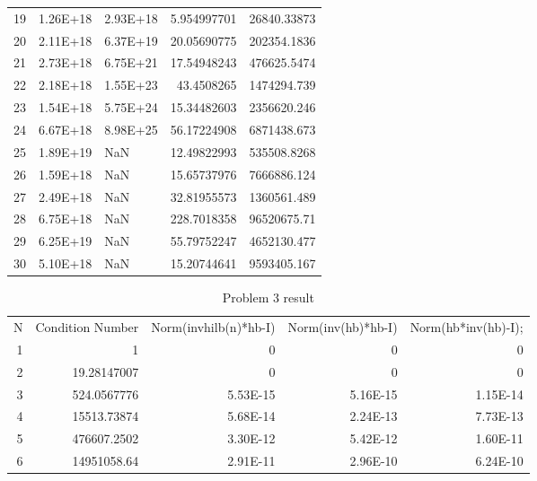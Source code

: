 \documentclass[12pt]{article}
\begin{document}
\begin{enumerate}
\begin{landscape}
\begin{table}[htbp]
\begin{tabular}{rrlrr}
      19    & 1.26E+18 & \multicolumn{1}{r}{2.93E+18} & 5.954997701 & 26840.33873 \\
      20    & 2.11E+18 & \multicolumn{1}{r}{6.37E+19} & 20.05690775 & 202354.1836 \\
      21    & 2.73E+18 & \multicolumn{1}{r}{6.75E+21} & 17.54948243 & 476625.5474 \\
      22    & 2.18E+18 & \multicolumn{1}{r}{1.55E+23} & 43.4508265 & 1474294.739 \\
      23    & 1.54E+18 & \multicolumn{1}{r}{5.75E+24} & 15.34482603 & 2356620.246 \\
      24    & 6.67E+18 & \multicolumn{1}{r}{8.98E+25} & 56.17224908 & 6871438.673 \\
      25    & 1.89E+19 & NaN   & 12.49822993 & 535508.8268 \\
      26    & 1.59E+18 & NaN   & 15.65737976 & 7666886.124 \\
      27    & 2.49E+18 & NaN   & 32.81955573 & 1360561.489 \\
      28    & 6.75E+18 & NaN   & 228.7018358 & 96520675.71 \\
      29    & 6.25E+19 & NaN   & 55.79752247 & 4652130.477 \\
      30    & 5.10E+18 & NaN   & 15.20744641 & 9593405.167 \\
      \end{tabular}%
    \label{tab:addlabel}%
  \end{table}%
    \end{landscape}
  \begin{landscape}
  \begin{table}[htbp]
    \centering
    \small
    \caption{Problem 3 result}
      \begin{tabular}{rrrrr}
      N     & \multicolumn{1}{l}{Condition Number} & \multicolumn{1}{l}{Norm(invhilb(n)*hb-I)} & \multicolumn{1}{l}{Norm(inv(hb)*hb-I)} & \multicolumn{1}{l}{Norm(hb*inv(hb)-I);} \\
      1     & 1     & 0     & 0     & 0 \\
      2     & 19.28147007 & 0     & 0     & 0 \\
      3     & 524.0567776 & 5.53E-15 & 5.16E-15 & 1.15E-14 \\
      4     & 15513.73874 & 5.68E-14 & 2.24E-13 & 7.73E-13 \\
      5     & 476607.2502 & 3.30E-12 & 5.42E-12 & 1.60E-11 \\
      6     & 14951058.64 & 2.91E-11 & 2.96E-10 & 6.24E-10 \\

\end{tabular}
\end{table}
\end{landscape}
\end{enumerate}
\end{document}
